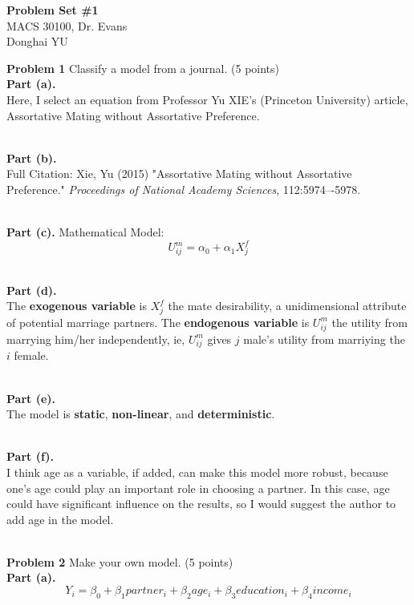 \documentclass[letterpaper,12pt]{article}
\theoremstyle{definition}
\begin{document}
\begin{flushleft}
  \textbf{\large{Problem Set \#1}} \\
  MACS 30100, Dr. Evans \\
  Donghai YU
\end{flushleft}

\vspace{5mm}

\noindent\textbf{Problem 1} Classify a model from a journal. (5 points)
\noindent\\\textbf{Part (a).} 
\\Here, I select an equation from Professor Yu XIE's (Princeton University) article, Assortative Mating without Assortative Preference.

\noindent\\\textbf{Part (b).} 
\\Full Citation: Xie, Yu (2015) "Assortative Mating without Assortative Preference." \textit{Proceedings of National Academy Sciences}, 112:5974–-5978.

\noindent\\\textbf{Part (c).} Mathematical Model:
\begin{equation*}
  U_{ij}^{m} = \alpha_{0} + \alpha_{1}X_{j}^{f}
\end{equation*}

\noindent\\\textbf{Part (d).} 
\\The \textbf{exogenous variable} is $X_{j}^{f}$ the mate desirability, a unidimensional attribute of potential marriage partners. The \textbf{endogenous variable} is $U_{ij}^{m}$ the utility from marrying him/her independently, ie, $U_{ij}^{m}$ gives $j$ male's utility from marriying the $i$ female. 

\noindent\\\textbf{Part (e).} 
\\The model is \textbf{static}, \textbf{non-linear}, and \textbf{deterministic}. 

\noindent\\\textbf{Part (f).} 
\\I think age as a variable, if added, can make this model more robust, because one's age could play an important role in choosing a partner. In this case, age could have significant influence on the results, so I would suggest the author to add age in the model. 

\pagebreak
\noindent\\\textbf{Problem 2} Make your own model. (5 points)
\noindent\\\textbf{Part (a).} 
\begin{equation*}
  Y_{i} = \beta_{0} + \beta_{1}partner_{i} + \beta_{2}age_{i} + \beta_{3}education_{i} + \beta_{4}income_{i}
\end{equation*}
\end{document}
